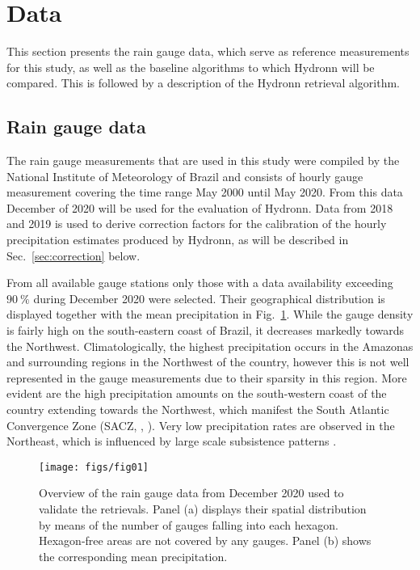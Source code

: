 \documentclass[journal abbreviation, manuscript]{copernicus}
\begin{document}
\section{Data}

This section presents the rain gauge data, which serve as reference measurements
for this study, as well as the baseline algorithms to which Hydronn will be
compared. This is followed by a description of the Hydronn retrieval algorithm.

\subsection{Rain gauge data}

The rain gauge measurements that are used in this study were compiled by the
National Institute of Meteorology of Brazil and consists of hourly gauge
measurement covering the time range May 2000 until May 2020. From this data
December of 2020 will be used for the evaluation of Hydronn. Data from 2018 and
2019 is used to derive correction factors for the calibration of the hourly
precipitation estimates produced by Hydronn, as will be described in
Sec.~\ref{sec:correction} below.

From all available gauge stations only those with a data availability exceeding
$90\ \unit{\%}$ during December 2020 were selected. Their geographical
distribution is displayed together with the mean precipitation in
Fig.~\ref{fig:gauges}. While the gauge density is fairly high on the
south-eastern coast of Brazil, it decreases markedly towards the Northwest.
Climatologically, the highest precipitation occurs in the Amazonas and
surrounding regions in the Northwest of the country, however this is not well
represented in the gauge measurements due to their sparsity in this region. More
evident are the high precipitation amounts on the south-western coast of the
country extending towards the Northwest, which manifest the South Atlantic
Convergence Zone (SACZ, \citeauthor{satyamarty98}, \citeyear{satyamarty98}).
Very low precipitation rates are observed in the Northeast, which is influenced
by large scale subsistence patterns \citep{siqueira19}.

\begin{figure}
  \centering
  \texttt{[image: figs/fig01]}
  \caption{
    Overview of the rain gauge data from December 2020 used to validate the
    retrievals. Panel (a) displays their spatial distribution by means of the
    number of gauges falling into each hexagon. Hexagon-free areas are not
    covered by any gauges. Panel (b) shows the corresponding mean precipitation.
    }
  \label{fig:gauges}
\end{figure}
    
\end{document}
